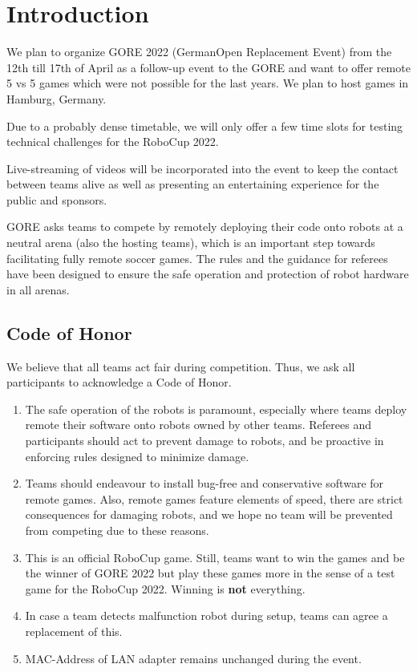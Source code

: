 \section{Introduction}

We plan to organize GORE 2022 (GermanOpen Replacement Event) from the 12th till 17th of April as a follow-up event to the GORE and want to offer remote 5 vs 5 games which were not possible for the last years. We plan to host games in Hamburg, Germany.

Due to a probably dense timetable, we will only offer a few time slots for testing technical challenges for the RoboCup 2022.

Live-streaming of videos will be incorporated into the event to keep the contact between teams alive as well as presenting an entertaining experience for the public and sponsors.

GORE asks teams to compete by remotely deploying their code onto robots at a neutral arena (also the hosting teams), which is an important step towards facilitating fully remote soccer games. The rules and the guidance for referees have been designed to ensure the safe operation and protection of robot hardware in all arenas.

\subsection{Code of Honor}

We believe that all teams act fair during competition. Thus, we ask all participants to acknowledge a Code of Honor.
\begin{enumerate}
    \item The safe operation of the robots is paramount, especially where teams deploy remote their software onto robots owned by other teams. Referees and participants should act to prevent damage to robots, and be proactive in enforcing rules  designed to minimize damage.
    \item Teams should endeavour to install bug-free and conservative software for remote games. Also, remote games feature elements of speed, there are strict consequences for damaging robots, and we hope no team will be prevented from competing due to these reasons.
    \item This is an official RoboCup game. Still, teams want to win the games and be the winner of GORE 2022 but play these games more in the sense of a test game for the RoboCup 2022. Winning is \textbf{not} everything.
    \item In case a team detects malfunction robot during setup, teams can agree a replacement of this.
    \item MAC-Address of LAN adapter remains unchanged during the event.
\end{enumerate} 

